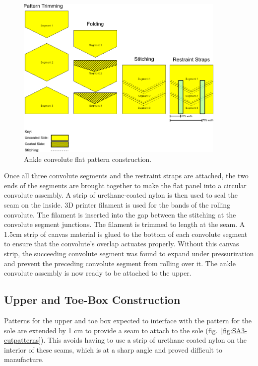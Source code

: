 \documentclass[defaultstyle,11pt]{thesis}
\begin{document}
\begin{figure}
\hypertarget{fig:SA3-convoluteflat}{%
\centering
\includegraphics[width=0.9\textwidth,height=\textheight]{../fig/SA3/ConvoluteConstruction.png}
\caption{Ankle convolute flat pattern construction.}\label{fig:SA3-convoluteflat}
}
\end{figure}

Once all three convolute segments and the restraint straps are attached, the two ends of the segments are brought together to make the flat panel into a circular convolute assembly.
A strip of urethane-coated nylon is then used to seal the seam on the inside.
3D printer filament is used for the bands of the rolling convolute.
The filament is inserted into the gap between the stitching at the convolute segment junctions.
The filament is trimmed to length at the seam.
A 1.5cm strip of canvas material is glued to the bottom of each convolute segment to ensure that the convolute's overlap actuates properly.
Without this canvas strip, the succeeding convolute segment was found to expand under pressurization and prevent the preceding convolute segment from rolling over it.
The ankle convolute assembly is now ready to be attached to the upper.

\hypertarget{upper-and-toe-box-construction}{%
\subsection{Upper and Toe-Box Construction}\label{upper-and-toe-box-construction}}

Patterns for the upper and toe box expected to interface with the pattern for the sole are extended by 1 cm to provide a seam to attach to the sole (fig.~\ref{fig:SA3-cutpatterns}).
This avoids having to use a strip of urethane coated nylon on the interior of these seams, which is at a sharp angle and proved difficult to manufacture.
\end{document}

